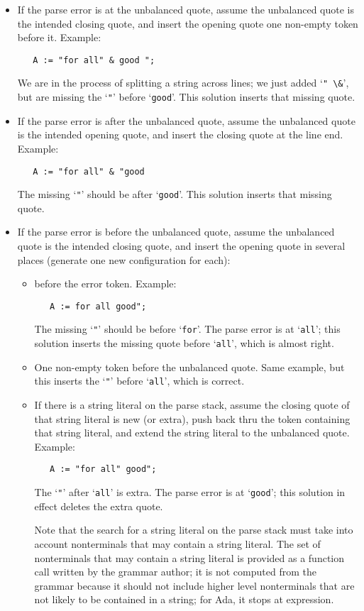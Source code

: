 \documentclass{article}
\newcommand{\code}[1]{`\lstinline|#1|'}
\begin{document}
\begin{itemize}
\item If the parse error is at the unbalanced quote, assume the unbalanced
quote is the intended closing quote, and insert the opening quote one
non-empty token before it. Example:
\begin{lstlisting}
   A := "for all" & good ";
\end{lstlisting}
We are in the process of splitting a string across lines; we just
added \code{" \&}, but are missing the \code{"} before \code{good}.
This solution inserts that missing quote.

\item If the parse error is after the unbalanced quote, assume the unbalanced
quote is the intended opening quote, and insert the closing quote at
the line end. Example:
\begin{lstlisting}
   A := "for all" & "good
\end{lstlisting}
The missing \code{"} should be after \code{good}.
This solution inserts that missing quote.

\item If the parse error is before the unbalanced quote, assume the unbalanced
quote is the intended closing quote, and insert the opening quote in
several places (generate one new configuration for each):

\begin{itemize}
\item before the error token. Example:
\begin{lstlisting}
   A := for all good";
\end{lstlisting}
The missing \code{"} should be before \code{for}. The parse error is at \code{all};
this solution inserts the missing quote before \code{all}, which is
almost right.

\item One non-empty token before the unbalanced quote. Same example,
  but this inserts the \code{"} before \code{all}, which is correct.

\item If there is a string literal on the parse stack, assume the
  closing quote of that string literal is new (or extra), push back
  thru the token containing that string literal, and extend the string
  literal to the unbalanced quote.
  Example:
\begin{lstlisting}
   A := "for all" good";
\end{lstlisting}
The \code{"} after \code{all} is extra. The parse error is at \code{good};
this solution in effect deletes the extra quote.

Note that the search for a string literal on the parse stack must take
into account nonterminals that may contain a string literal. The set
of nonterminals that may contain a string literal is provided as a
function call written by the grammar author; it is not computed from
the grammar because it should not include higher level nonterminals
that are not likely to be contained in a string; for Ada, it stops at
expression.
\end{itemize}
\end{itemize}
\end{document}
